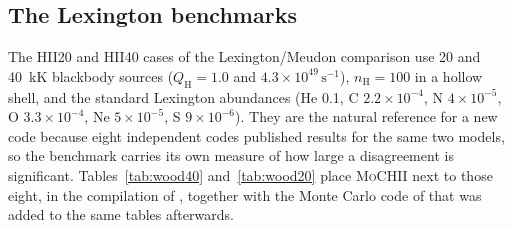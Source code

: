 \documentclass[twocolumn,linenumbers]{aastex702}
\newcommand{\MoCHII}{\textsc{MoCHII}}
\newcommand{\nH}{n_{\mathrm{H}}}
\newcommand{\QH}{Q_{\mathrm{H}}}
\begin{document}
\subsection{The Lexington benchmarks}
\label{sec:hii}

The HII20 and HII40 cases of the Lexington/Meudon comparison
\citep{ferland1995,pequignot2001} use 20 and 40~kK blackbody sources
($\QH = 1.0$ and $4.3\times10^{49}\,\mathrm{s^{-1}}$), $\nH = 100$ in a
hollow shell, and the standard Lexington abundances (He 0.1, C
$2.2\times10^{-4}$, N $4\times10^{-5}$, O $3.3\times10^{-4}$, Ne
$5\times10^{-5}$, S $9\times10^{-6}$).  They are the natural reference for a
new code because eight independent codes published results for the same two
models, so the benchmark carries its own measure of how large a
disagreement is significant.  Tables~\ref{tab:wood40} and~\ref{tab:wood20}
place \MoCHII{} next to those eight, in the compilation of
\citet{ercolano2003}, together with the Monte Carlo code of
\citet{wood2004} that was added to the same tables afterwards.
\end{document}
